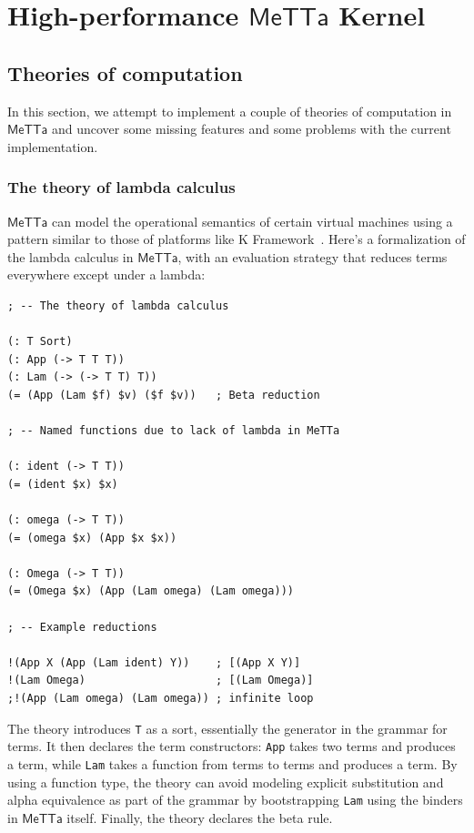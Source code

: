 \documentclass{article}
\begin{document}
\section{High-performance $\mathsf{MeTTa}$ Kernel}

\subsection{Theories of computation}
\label{Theories of computation}

In this section, we attempt to implement a couple of theories of
computation in $\mathsf{MeTTa}$ and uncover some missing features and
some problems with the current implementation.

\subsubsection{The theory of lambda calculus}
$\mathsf{MeTTa}$ can model the operational semantics of certain
virtual machines using a pattern similar to those of platforms like K
Framework~\cite{kframework}.  Here's a formalization of the lambda
calculus in $\mathsf{MeTTa}$, with an evaluation strategy that reduces
terms everywhere except under a lambda:

\begin{verbatim}
; -- The theory of lambda calculus

(: T Sort)
(: App (-> T T T))
(: Lam (-> (-> T T) T))
(= (App (Lam $f) $v) ($f $v))   ; Beta reduction

; -- Named functions due to lack of lambda in MeTTa

(: ident (-> T T))
(= (ident $x) $x)

(: omega (-> T T))
(= (omega $x) (App $x $x))

(: Omega (-> T T))
(= (Omega $x) (App (Lam omega) (Lam omega)))

; -- Example reductions

!(App X (App (Lam ident) Y))    ; [(App X Y)]
!(Lam Omega)                    ; [(Lam Omega)]
;!(App (Lam omega) (Lam omega)) ; infinite loop
\end{verbatim}

The theory introduces \verb+T+ as a sort, essentially the generator in the grammar for terms.  It then declares the term constructors: \verb+App+ takes two terms and produces a term, while \verb+Lam+ takes a function from terms to terms and produces a term.  By using a function type, the theory can avoid modeling explicit substitution and alpha equivalence as part of the grammar by bootstrapping \verb+Lam+ using the binders in $\mathsf{MeTTa}$ itself.  Finally, the theory declares the beta rule.
\end{document}
